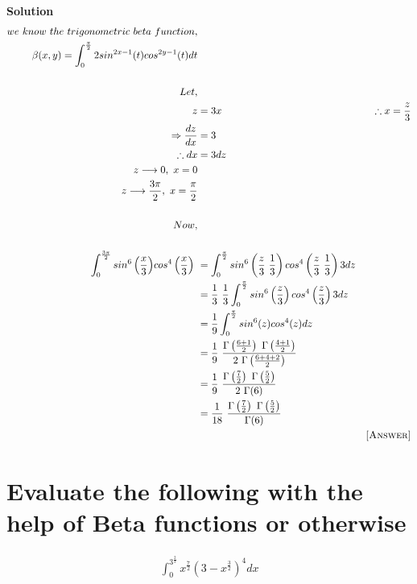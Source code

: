 \documentclass[12pt]{article}
\begin{document}
\textbf{Solution}
\begin{align*}
    we\ know\ the\ trigonometric\ beta\ function,\\
    \beta(x,y)=\int_{0}^{\frac{\pi}{2}}{2sin^{2x-1}(t)}{cos^{2y-1}(t)dt}\\\\
    Let,\\ z&=3x & \therefore x=\frac{z}{3}\\
    \Rightarrow\frac{dz}{dx}&=3\\
    \therefore dx&=3dz\\
    z \longrightarrow 0, \ x=0\\
    z \longrightarrow \frac{3\pi}{2}, \ x=\frac{\pi}{2}\\\\
    Now,\\\\ \int_{0}^{\frac{3\pi}{2}}{sin^6\left(\frac{x}{3}\right)}{cos^4\left(\frac{x}{3}\right)}\ &= \int_{0}^{\frac{\pi}{2}}sin^6\left(\frac{z}{3}\ \frac{1}{3}\right) cos^4\left(\frac{z}{3}\ \frac{1}{3}\right)3dz\\
    &=\frac{1}{3}\ \frac{1}{3} \int_{0}^{\frac{\pi}{2}}sin^6\left(\frac{z}{3}\right)cos^4\left(\frac{z}{3}\right)3dz\\
    &=\frac{1}{9} \int_{0}^{\frac{\pi}{2}}sin^6(z)cos^4(z)dz\\
    &= \frac{1}{9}\ \frac{\Gamma\left(\frac{6+1}{2}\right)\ \Gamma\left(\frac{4+1}{2}\right)}{2\ \Gamma\left(\frac{6+4+2}{2}\right)}\\
    &= \frac{1}{9}\ \frac{\Gamma\left(\frac{7}{2}\right)\ \Gamma\left(\frac{5}{2}\right)}{2\ \Gamma(6)}\\
    &= \frac{1}{18}\ \frac{\Gamma\left(\frac{7}{2}\right)\ \Gamma\left(\frac{5}{2}\right)}{\Gamma(6)}\\
    & & \textsc{[Answer]}
\end{align*}
\pagebreak


\section{Evaluate the following with the help of Beta functions or otherwise}


\begin{align*}
    \int_{0}^{3^{\frac{2}{3}}}{x^{\frac{7}{2}}}{\left(3-x^{\frac{3}{2}}\right)^4}dx\\
\end{align*}
\end{document}
